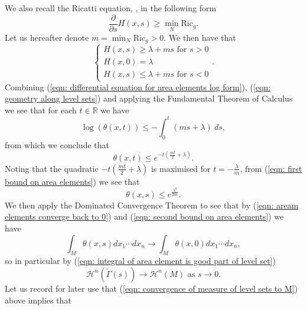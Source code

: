\documentclass[11pt]{article}
\begin{document}
We also recall the Ricatti equation, \cite[Corollary 3.6.]{tubes}, in the following form
\begin{equation}\label{eqn: Ricatti equation}
    \frac{\partial}{\partial s}H(x,s) \geq \min_N \mathrm{Ric}_g.
\end{equation}
Let us hereafter denote $m = \min_N \mathrm{Ric}_g> 0$. We then have that
\begin{equation}\label{eqn: geometry along level sets}
    \begin{cases}
    H(x,s) \geq \lambda + ms \text{ for } s > 0\\
    H(x,0) = \lambda\\
    H(x,s) \leq \lambda + ms \text{ for } s < 0
    \end{cases}.
\end{equation}
Combining (\ref{eqn: differential equation for area elements log form}), (\ref{eqn: geometry along level sets}) and applying the Fundamental Theorem of Calculus we see that for each $t \in \mathbb{R}$ we have 
\begin{equation*}
    \log (\theta(x,t)) \leq  - \int_0^t (ms + \lambda) \: ds,
\end{equation*}
from which we conclude that
\begin{equation}\label{eqn: first bound on area elements}
    \theta(x,t) \leq e^{-t\left(\frac{mt}{2} + \lambda \right)}.
\end{equation}
 Noting that the quadratic $-t\left(\frac{mt}{2} + \lambda \right)$ is maximised for $t = -\frac{\lambda}{m}$, from (\ref{eqn: first bound on area elements}) we see that
\begin{equation}\label{eqn: second bound on area elements}
    \theta(x,s) \leq e^{\frac{\lambda^2}{2m}}.
\end{equation}
We then apply the Dominated Convergence Theorem to see that by (\ref{eqn: aream elements converge back to 0}) and (\ref{eqn: second bound on area elements}) we have
\begin{equation*}
    \int_{M} \theta(x,s) dx_1 \cdots dx_n \rightarrow \int_{M} \theta(x,0) dx_1 \cdots dx_n,
\end{equation*}
so in particular by (\ref{eqn: integral of area element is good part of level set})
\begin{equation}\label{eqn: convergence of measure of level sets to M}
\mathcal{H}^n(\widetilde{\Gamma}(s)) \rightarrow \mathcal{H}^n(M) \text{ as } s \rightarrow 0.
\end{equation}
Let us record for later use that (\ref{eqn: convergence of measure of level sets to M}) above implies that
\end{document}
